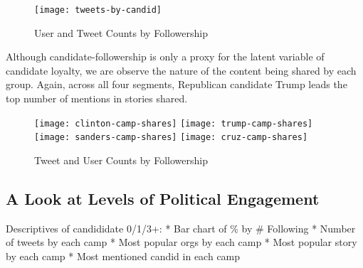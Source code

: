 \begin{figure}[H] 
\centering 
 \texttt{[image: tweets-by-candid]}  
  \caption{User and Tweet Counts by Followership
    \label{fig:users-by-candid}}
\end{figure}


Although candidate-followership is only a proxy for the latent variable of candidate loyalty, we are observe the nature of the content being shared by each group. Again, across all four segments, Republican candidate Trump leads the top number of mentions in stories shared.

\begin{figure}[H] 
\centering 
 \texttt{[image: clinton-camp-shares]}
 \texttt{[image: trump-camp-shares]}  
 \texttt{[image: sanders-camp-shares]}  
 \texttt{[image: cruz-camp-shares]}  
  \caption{Tweet and User Counts by Followership
    \label{fig:users-tweets-by-candid}}
\end{figure}
 
\subsection{A Look at Levels of Political Engagement}
Descriptives of candididate 0/1/3+:
* Bar chart of \% by \# Following
* Number of tweets by each camp
* Most popular orgs by each camp
* Most popular story by each camp
* Most mentioned candid in each camp












